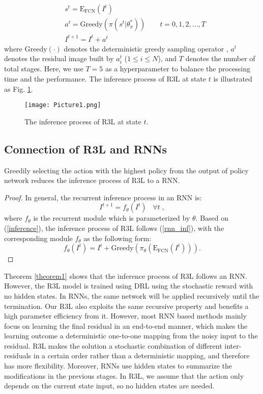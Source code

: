 \documentclass{article}
\begin{document}
\begin{equation}
\begin{aligned}
&s^t = \text{E}_\text{FCN}(I^t)\\
&a^t = \text{Greedy}(\pi(s^t|\theta_\pi^*)) \quad \quad t =  0,1,2,...,T\\
&I^{t+1} = I^t+a^t
\end{aligned}\label{inference}
\end{equation}
where $\text{Greedy}(\cdot)$ denotes the deterministic greedy sampling operator \cite{kool2018attention,zhang2020deep}, $a^t$ denotes the residual image built by $a_i^t$ ($1 \leq i \leq N$), and $T$ denotes the number of total stages. Here, we use $T=5$ as a hyperparameter to balance the processing time and the performance. The inference process of R3L at state $t$ is illustrated as Fig. \ref{fig:inference}.
\begin{figure}[t]
\centering
\texttt{[image: Picture1.png]}
\caption{The inference process of R3L at state $t$.}
\label{fig:inference}
\end{figure}
\subsection{Connection of R3L and RNNs}
\begin{theorem}\label{theorem1}
Greedily selecting the action with the highest policy from the output of policy network reduces the inference process of R3L to a RNN.
\end{theorem}
\begin{proof}\renewcommand{\qedsymbol}{}
In general, the recurrent inference process in an RNN is:
\begin{equation}\label{rnn_inf}
    I^{t+1} = f_\theta (I^t) \;\;\; \forall t\;,
\end{equation}
where $f_\theta$ is the recurrent module which is parameterized by $\theta$.
Based on (\ref{inference}), the inference process of R3L follows (\ref{rnn_inf}), with the corresponding module $f_\theta$ as the following form:
\begin{equation}
    f_\theta(I^t) = I^t + \text{Greedy}(\pi_\theta( \text{E}_\text{FCN}(I^t))).
\end{equation}
\end{proof}
Theorem \ref{theorem1} shows that the inference process of R3L follows an RNN. However, the R3L model is trained using DRL using the stochastic reward with no hidden states. In RNNs, the same network will be applied recursively until the termination. Our R3L also exploits the same recursive property and benefits a high parameter efficiency from it. However, most RNN based methods mainly focus on learning the final residual in an end-to-end manner, which makes the learning outcome a deterministic one-to-one mapping from the noisy input to the residual. R3L makes the solution a stochastic combination of different inter-residuals in a certain order rather than a deterministic mapping, and therefore has more flexibility. Moreover, RNNs use hidden states to summarize the modifications in the previous stages. In R3L, we assume that the action only depends on the current state input, so no hidden states are needed. 
\end{document}
